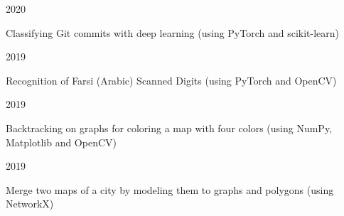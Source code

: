 

\begin{cvprojects}

  \cvproject
    {} %
    {} %
    {} %
    {2020} %
    {
      \begin{cvitems} %
        \item {Classifying Git commits with deep learning (using PyTorch and scikit-learn)}
      \end{cvitems}
    }

  \cvproject
    {} %
    {} %
    {} %
    {2019} %
    {
      \begin{cvitems} %
        \item {Recognition of Farsi (Arabic) Scanned Digits (using PyTorch and OpenCV)}
      \end{cvitems}
    }

  \cvproject
    {} %
    {} %
    {} %
    {2019} %
    {
      \begin{cvitems} %
        \item {Backtracking on graphs for coloring a map with four colors (using NumPy, Matplotlib and OpenCV)}
      \end{cvitems}
    }



  \cvproject
    {} %
    {} %
    {} %
    {2019} %
    {
      \begin{cvitems} %
        \item {Merge two maps of a city by modeling them to graphs and polygons (using NetworkX)}
      \end{cvitems}
    }


\end{cvprojects}
